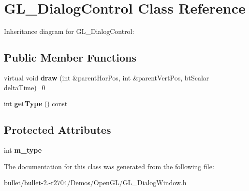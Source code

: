 \hypertarget{class_g_l___dialog_control}{\section{G\+L\+\_\+\+Dialog\+Control Class Reference}
\label{class_g_l___dialog_control}
}


Inheritance diagram for G\+L\+\_\+\+Dialog\+Control\+:
\subsection*{Public Member Functions}
\begin{DoxyCompactItemize}
\item 
\hypertarget{class_g_l___dialog_control_ab5481937f220ddcda4803f5f569197d8}{virtual void {\bfseries draw} (int \&parent\+Hor\+Pos, int \&parent\+Vert\+Pos, bt\+Scalar delta\+Time)=0}\label{class_g_l___dialog_control_ab5481937f220ddcda4803f5f569197d8}

\item 
\hypertarget{class_g_l___dialog_control_a633950c32d9e4bd68a13bfbd89fa086b}{int {\bfseries get\+Type} () const }\label{class_g_l___dialog_control_a633950c32d9e4bd68a13bfbd89fa086b}

\end{DoxyCompactItemize}
\subsection*{Protected Attributes}
\begin{DoxyCompactItemize}
\item 
\hypertarget{class_g_l___dialog_control_a1d8c300ead1d76b185340b1921ccba2f}{int {\bfseries m\+\_\+type}}\label{class_g_l___dialog_control_a1d8c300ead1d76b185340b1921ccba2f}

\end{DoxyCompactItemize}


The documentation for this class was generated from the following file\+:\begin{DoxyCompactItemize}
\item 
bullet/bullet-\/2.-\/r2704/\+Demos/\+Open\+G\+L/G\+L\+\_\+\+Dialog\+Window.\+h\end{DoxyCompactItemize}
